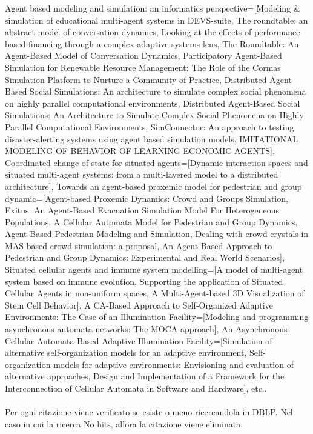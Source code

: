 \documentclass[12pt]{article}
\begin{document}
{Agent based modeling and simulation: an informatics perspective=[Modeling \& simulation of educational multi-agent systems in DEVS-suite, The roundtable: an abstract model of conversation dynamics, Looking at the effects of performance-based financing through a complex adaptive systems lens, The Roundtable: An Agent-Based Model of Conversation Dynamics, Participatory Agent-Based Simulation for Renewable Resource Management: The Role of the Cormas Simulation Platform to Nurture a Community of Practice, Distributed Agent-Based Social Simulations: An architecture to simulate complex social phenomena on highly parallel computational environments, Distributed Agent-Based Social Simulations: An Architecture to Simulate Complex Social Phenomena on Highly Parallel Computational Environments, SimConnector: An approach to testing disaster-alerting systems using agent based simulation models, IMITATIONAL MODELING OF BEHAVIOR OF LEARNING ECONOMIC AGENTS], Coordinated change of state for situated agents=[Dynamic interaction spaces and situated multi-agent systems: from a multi-layered model to a distributed architecture], Towards an agent-based proxemic model for pedestrian and group dynamic=[Agent-based Proxemic Dynamics: Crowd and Groups Simulation, Exitus: An Agent-Based Evacuation Simulation Model For Heterogeneous Populations, A Cellular Automata Model for Pedestrian and Group Dynamics, Agent-Based Pedestrian Modeling and Simulation, Dealing with crowd crystals in MAS-based crowd simulation: a proposal, An Agent-Based Approach to Pedestrian and Group Dynamics: Experimental and Real World Scenarios], Situated cellular agents and immune system modelling=[A model of multi-agent system based on immune evolution, Supporting the application of Situated Cellular Agents in non-uniform spaces, A Multi-Agent-based 3D Visualization of Stem Cell Behavior], A CA-Based Approach to Self-Organized Adaptive Environments: The Case of an Illumination Facility=[Modeling and programming asynchronous automata networks: The MOCA approach], An Asynchronous Cellular Automata-Based Adaptive Illumination Facility=[Simulation of alternative self-organization models for an adaptive environment, Self-organization models for adaptive environments: Envisioning and evaluation of alternative approaches, Design and Implementation of a Framework for the Interconnection of Cellular Automata in Software and Hardware], etc.. \\\\
Per ogni citazione viene verificato se esiste o meno ricercandola in DBLP. Nel caso in cui la ricerca No hits, allora la citazione viene eliminata.

}
\end{document}

